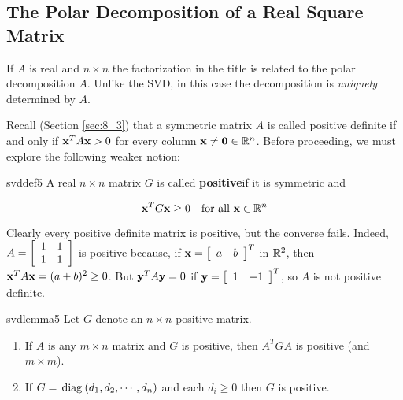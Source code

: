 \subsection{The Polar Decomposition of a Real Square Matrix}


\noindent If $A$ is real and $n\times n$ the factorization in the title is
related to the polar decomposition $A$. Unlike the SVD, in this case the
decomposition is \emph{uniquely} determined by $A$. 

Recall (Section \ref{sec:8_3}) that a symmetric matrix $A$ is called positive definite if and only if
$\textbf{x}^{T}A\textbf{x}>0$ for every column $\textbf{x} \neq \textbf{0} \in \mathbb{R}^{n}$. Before
proceeding, we must explore the following weaker notion:

\begin{definition}{}{svddef5} 
A real $n\times n$ matrix $G$ is called \textbf{positive}\footnotemark if it is symmetric and 

\begin{equation*}
\textbf{x}^{T}G\textbf{x}\geq 0 \quad \mbox{for all } \textbf{x}\in \mathbb{R}^{n}
\end{equation*}
\end{definition}

\noindent Clearly every positive definite matrix is positive, but the
converse fails. Indeed, $A=
\left[ 
\begin{array}{cc}
1 & 1 \\ 
1 & 1
\end{array}
\right] $ is positive because, if $\textbf{x}=\left[ \begin{array}{cc} a & b \end{array}\right]^{T}$ in $\mathbb{R}^{2}$, then $\textbf{x}^{T}A\textbf{x}=(a+b)^{2}\geq 0$. But $\textbf{y}^{T}A\textbf{y}=0$ if $\textbf{y}=\left[ \begin{array}{cc} 1 & -1 \end{array}\right]^{T}$, so $A$ is not positive
definite.

\begin{lemma}{}{svdlemma5}
Let $G$ denote an $n\times n$ positive matrix.

\begin{enumerate}
\item If $A$ is any $m\times n$ matrix and $G$ is positive, then $A^{T}GA$ is positive (and $m\times m$).

\item If $G=\thinspace\operatorname{diag\medspace}(d_{1}, d_{2},\cdots ,d_{n})$ and each $d_{i}\geq 0$ then $G$ is positive.
\end{enumerate}
\end{lemma}

